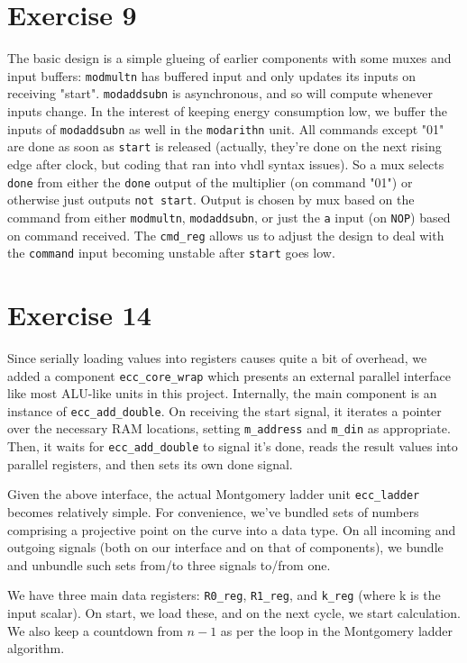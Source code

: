 \documentclass[a4paper,twoside]{article}
\newcommand{\atom}[1]{\mbox{\texttt{#1}}}
\begin{document}
\section*{Exercise 9}
The basic design is a simple glueing of earlier components with
some muxes and input buffers: \atom{modmultn} has buffered input and only
updates its inputs on receiving "start".  \atom{modaddsubn} is asynchronous, and
so will compute whenever inputs change.  In the interest of keeping energy
consumption low, we buffer the inputs of \atom{modaddsubn} as well in the
\atom{modarithn} unit. All commands except "01" are done as soon as \atom{start}
is released (actually, they're done on the next rising edge after clock, but
coding that ran into vhdl syntax issues). So a mux selects \atom{done} from
either the \atom{done} output of the multiplier (on command "01") or otherwise
just outputs \atom{not start}. Output is chosen by mux based on the command from
either \atom{modmultn}, \atom{modaddsubn}, or just the \atom{a} input (on
\atom{NOP}) based on command received. The \atom{cmd\_reg} allows us to adjust
the design to deal with the \atom{command} input becoming unstable after
\atom{start} goes low.


\section*{Exercise 14}
Since serially loading values into registers causes quite a bit of overhead, we
added a component \atom{ecc\_core\_wrap} which presents an external parallel
interface like most ALU-like units in this project. Internally, the main
component is an instance of \atom{ecc\_add\_double}. On receiving the
start signal, it iterates a pointer over the necessary RAM locations, setting
\atom{m\_address} and \atom{m\_din} as appropriate. Then, it waits for
\atom{ecc\_add\_double} to signal it's done, reads the result values into
parallel registers, and then sets its own done signal.

Given the above interface, the actual Montgomery ladder unit \atom{ecc\_ladder}
becomes relatively simple. For convenience, we've bundled sets of numbers
comprising a projective point on the curve into a data type. On all incoming and
outgoing signals (both on our interface and on that of components), we bundle
and unbundle such sets from/to three signals to/from one.

We have three main data registers: \atom{R0\_reg}, \atom{R1\_reg}, and
\atom{k\_reg} (where k is the input scalar). On start, we load these, and on the
next cycle, we start calculation. We also keep a countdown from $n-1$ as per the
loop in the Montgomery ladder algorithm.
\end{document}
